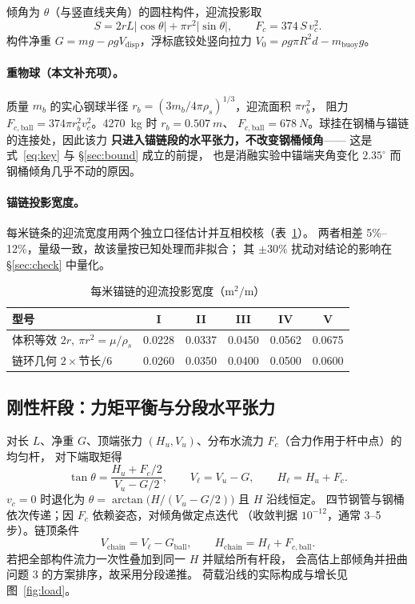 \documentclass[UTF8,a4paper,zihao=-4]{ctexart}
\begin{document}
倾角为 \(\theta\)（与竖直线夹角）的圆柱构件，迎流投影取
\begin{equation}
S=2rL|\cos\theta|+\pi r^2|\sin\theta|,\qquad F_c=374\,S\,v_c^2 .
\end{equation}
构件净重 \(G=mg-\rho gV_{\mathrm{disp}}\)，浮标底铰处竖向拉力
\(V_0=\rho g\pi R^2d-m_{\mathrm{buoy}}g\)。

\paragraph{重物球（本文补充项）。}
质量 \(m_b\) 的实心钢球半径 \(r_b=(3m_b/4\pi\rho_s)^{1/3}\)，迎流面积 \(\pi r_b^2\)，
阻力 \(F_{c,\mathrm{ball}}=374\pi r_b^2v_c^2\)。\SI{4270}{kg} 时 \(r_b=\SI{0.507}{m}\)、
\(F_{c,\mathrm{ball}}=\SI{678}{N}\)。球挂在钢桶与锚链的连接处，因此该力
\textbf{只进入锚链段的水平张力，不改变钢桶倾角}——
这是式~\eqref{eq:key} 与 \S\ref{sec:bound} 成立的前提，
也是消融实验中锚端夹角变化 \(2.35^\circ\) 而钢桶倾角几乎不动的原因。

\paragraph{锚链投影宽度。}
每米链条的迎流宽度用两个独立口径估计并互相校核（表~\ref{tab:width}）。
两者相差 5\%--12\%，量级一致，故该量按已知处理而非拟合；
其 \(\pm30\%\) 扰动对结论的影响在 \S\ref{sec:check} 中量化。

\begin{table}[H]
\centering
\caption{每米锚链的迎流投影宽度（\(\mathrm{m^2/m}\)）}
\label{tab:width}
\begin{tabular}{lccccc}
\toprule
型号 & I & II & III & IV & V \\
\midrule
体积等效 \(2r,\ \pi r^2=\mu/\rho_s\) & 0.0228 & 0.0337 & 0.0450 & 0.0562 & 0.0675 \\
链环几何 \(2\times\)节长\(/6\) & 0.0260 & 0.0350 & 0.0400 & 0.0500 & 0.0600 \\
\bottomrule
\end{tabular}
\end{table}

\subsection{刚性杆段：力矩平衡与分段水平张力}\label{sec:rod}

对长 \(L\)、净重 \(G\)、顶端张力 \((H_u,V_u)\)、分布水流力 \(F_c\)（合力作用于杆中点）的均匀杆，
对下端取矩得
\begin{equation}\label{eq:rod}
\tan\theta=\frac{H_u+F_c/2}{V_u-G/2},\qquad
V_{\ell}=V_u-G,\qquad
H_{\ell}=H_u+F_c .
\end{equation}
\(v_c=0\) 时退化为 \(\theta=\arctan\bigl(H/(V_u-G/2)\bigr)\) 且 \(H\) 沿线恒定。
四节钢管与钢桶依次传递；因 \(F_c\) 依赖姿态，对倾角做定点迭代
（收敛判据 \(10^{-12}\)，通常 3--5 步）。链顶条件
\begin{equation}
V_{\mathrm{chain}}=V_{\ell}-G_{\mathrm{ball}},\qquad
H_{\mathrm{chain}}=H_{\ell}+F_{c,\mathrm{ball}} .
\end{equation}
若把全部构件流力一次性叠加到同一 \(H\) 并赋给所有杆段，
会高估上部倾角并扭曲问题 3 的方案排序，故采用分段递推。
荷载沿线的实际构成与增长见图~\ref{fig:load}。
\end{document}

